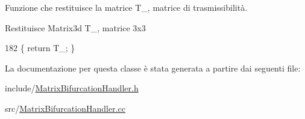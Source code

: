 Funzione che restituisce la matrice T\-\_\-, matrice di trasmissibilità. 

\begin{DoxyReturn}{Restituisce}
Matrix3d T\-\_\-, matrice 3x3 
\end{DoxyReturn}

\begin{DoxyCode}
182 \{ \textcolor{keywordflow}{return} T\_; \}
\end{DoxyCode}


La documentazione per questa classe è stata generata a partire dai seguenti file\-:\begin{DoxyCompactItemize}
\item 
include/\hyperlink{MatrixBifurcationHandler_8h}{Matrix\-Bifurcation\-Handler.\-h}\item 
src/\hyperlink{MatrixBifurcationHandler_8cc}{Matrix\-Bifurcation\-Handler.\-cc}\end{DoxyCompactItemize}
